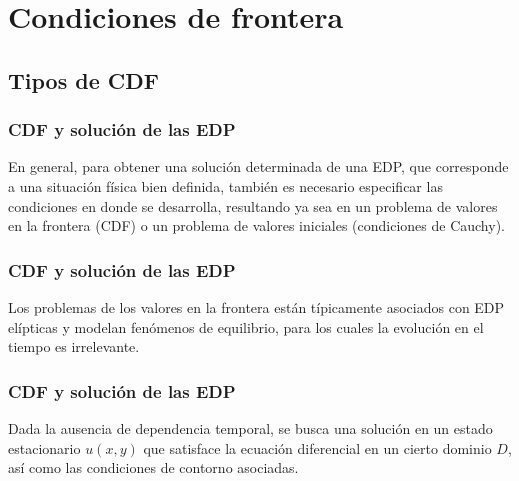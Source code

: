 \section{Condiciones de frontera}
\subsection{Tipos de CDF}
\begin{frame}
\frametitle{CDF y solución de las EDP}
En general, para obtener una solución determinada de una EDP, que corresponde a una situación física bien definida, también es necesario especificar las condiciones en donde se desarrolla, resultando ya sea en un problema de valores en la frontera (CDF) o un problema de valores iniciales (condiciones de Cauchy).
\end{frame}
\begin{frame}
\frametitle{CDF y solución de las EDP}
Los problemas de los valores en la frontera están típicamente asociados con EDP elípticas y modelan fenómenos de equilibrio, para los cuales la evolución en el tiempo es irrelevante.
\end{frame}
\begin{frame}
\frametitle{CDF y solución de las EDP}
Dada la ausencia de dependencia temporal, se busca una solución en un estado estacionario $u(x, y)$ que satisface la ecuación diferencial en un cierto dominio $D$, así como las condiciones de contorno asociadas. 
\end{frame}
